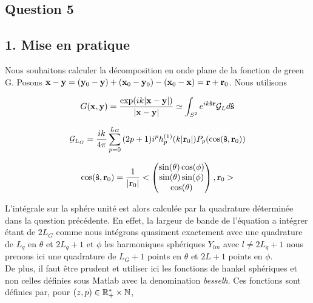 \documentclass[10pt]{article}
\begin{document}
\begin{multicols}{2}










\section*{Question 5}

\subsection*{1. Mise en pratique}

Nous souhaitons calculer la décomposition en onde plane de la fonction de green G. Posons ${\bf x} - {\bf y} = ({\bf y}_0 - {\bf y}) + ({\bf x}_0 - {\bf y}_0) - ({\bf x}_0 - {\bf x}) = {\bf r} + {\bf r}_0$. Nous utilisons

\begin{equation}
	G({\bf x}, {\bf y}) = \frac{\exp(ik|{\bf x}-{\bf y}|)}{|{\bf x}-{\bf y}|} \simeq \int_{S^{2}}{e^{ik{\bf \hat{s}}{\bf r}}\mathcal{G}_Ld{\bf \hat{s}}}
\end{equation}

\vspace*{-11pt}

\begin{equation}
\mathcal{G}_{L_G} = \frac{ik}{4\pi}\sum_{p=0}^{L_G}{(2p+1)i^{p}h_p^{(1)}(k|{\bf r}_0|)P_p(\cos({\bf \hat{s}}, {\bf r}_0))}
\end{equation}

\vspace*{-11pt}

\begin{equation}
\cos({\bf \hat{s}}, {\bf r}_0) = \frac{1}{|{\bf r}_0|}< \begin{pmatrix} \sin(\theta)\cos(\phi)  \\ \sin(\theta)\sin(\phi)  \\ \cos(\theta) \end{pmatrix} , {\bf r}_0 >
\end{equation}


L'intégrale sur la sphére unité est alors calculée par la quadrature déterminée dans la question précédente. En effet, la largeur de bande de l'équation a intégrer étant de $2L_G$ comme nous intégrons quasiment exactement avec une quadrature de $L_q$ en $\theta$ et $2L_q+1$ et $\phi$ les harmoniques sphériques $Y_{lm}$ avec $l \ne 2L_q+1$ nous prenons ici une quadrature de $L_G+1$ points en $\theta$ et $2L+1$ points en $\phi$. \\
\indent
De plus, il faut être prudent et utiliser ici les fonctions de hankel sphériques et non celles définies sous Matlab avec la denomination \textit{besselh}. Ces fonctions sont définies par, pour $(z,p) \in \mathbb{R}^{*}_{+}\times\mathbb{N}$,


\end{multicols}
\end{document}
